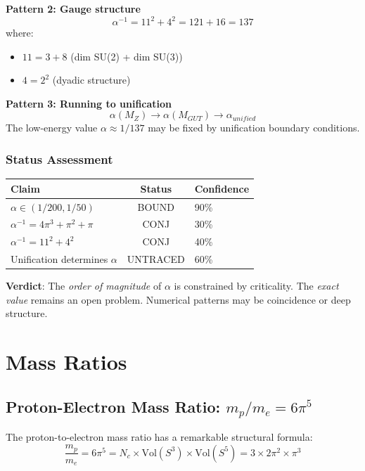 \textbf{Pattern 2: Gauge structure}
\begin{equation}
\alpha^{-1} = 11^2 + 4^2 = 121 + 16 = 137
\end{equation}
where:
\begin{itemize}
    \item $11 = 3 + 8$ (dim SU(2) + dim SU(3))
    \item $4 = 2^2$ (dyadic structure)
\end{itemize}

\textbf{Pattern 3: Running to unification}
\begin{equation}
\alpha(M_Z) \to \alpha(M_{GUT}) \to \alpha_{unified}
\end{equation}
The low-energy value $\alpha \approx 1/137$ may be fixed by unification boundary conditions.

\subsubsection{Status Assessment}

\begin{center}
\begin{tabular}{lcl}
\hline
Claim & Status & Confidence \\
\hline
$\alpha \in (1/200, 1/50)$ & BOUND & 90\% \\
$\alpha^{-1} = 4\pi^3 + \pi^2 + \pi$ & CONJ & 30\% \\
$\alpha^{-1} = 11^2 + 4^2$ & CONJ & 40\% \\
Unification determines $\alpha$ & UNTRACED & 60\% \\
\hline
\end{tabular}
\end{center}

\textbf{Verdict}: The \textit{order of magnitude} of $\alpha$ is constrained by criticality. The \textit{exact value} remains an open problem. Numerical patterns may be coincidence or deep structure.

\section{Mass Ratios}

\subsection{Proton-Electron Mass Ratio: $m_p/m_e = 6\pi^5$}

The proton-to-electron mass ratio has a remarkable structural formula:
\begin{equation}
\boxed{\frac{m_p}{m_e} = 6\pi^5 = N_c \times \text{Vol}(S^3) \times \text{Vol}(S^5) = 3 \times 2\pi^2 \times \pi^3}
\end{equation}

